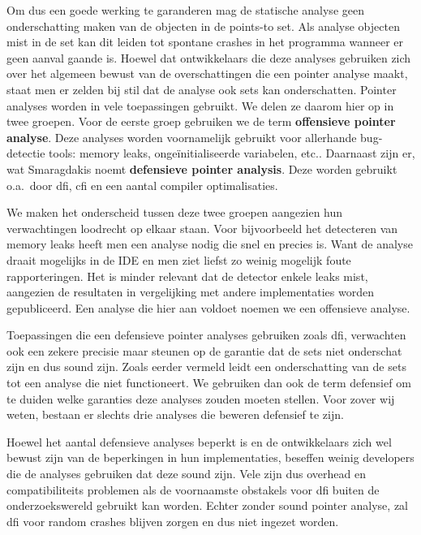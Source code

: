 \documentclass[conference]{IEEEtran}
\begin{document}
Om dus een goede werking te garanderen mag de statische analyse geen onderschatting maken van de objecten in de points-to set. Als analyse objecten mist in de set kan 
dit leiden tot spontane crashes in het programma wanneer er geen aanval gaande is. Hoewel dat ontwikkelaars die deze analyses gebruiken zich over het algemeen bewust 
van de overschattingen die een pointer analyse maakt, staat men er zelden bij stil dat de analyse ook sets kan onderschatten.
Pointer analyses worden in vele toepassingen gebruikt. We delen ze daarom hier op in twee groepen. Voor de eerste groep gebruiken we de term \textbf{offensieve pointer analyse}.
Deze analyses worden voornamelijk gebruikt voor allerhande bug-detectie tools: memory leaks, ongeïnitialiseerde variabelen, 
etc.\cite{sui_svf_nodate}\cite{cherem_practical_nodate}\cite{ye_accelerating_nodate}. Daarnaast zijn er, wat Smaragdakis\cite{smaragdakis_defensive_2018} noemt 
\textbf{defensieve pointer analysis}. Deze worden gebruikt o.a.\ door \gls{dfi}\cite{castro_securing_nodate}\cite{diez-franco_optimized_2024}, 
\gls{cfi}\cite{kasten_integrating_2024}\cite{li_finding_2020} en een aantal compiler optimalisaties\cite{hind_interprocedural_1999}. 

We maken het onderscheid tussen deze twee groepen aangezien hun verwachtingen loodrecht op elkaar staan. Voor bijvoorbeeld het detecteren van memory leaks heeft men 
een analyse nodig die snel en precies is\cite{cherem_practical_nodate}\cite{fan_smoke_2019}. Want de analyse draait mogelijks in de IDE en men ziet liefst zo weinig 
mogelijk foute rapporteringen. Het is minder relevant dat de detector enkele leaks mist, aangezien de resultaten in vergelijking met andere implementaties worden gepubliceerd.
Een analyse die hier aan voldoet noemen we een offensieve analyse.

Toepassingen die een defensieve pointer analyses gebruiken zoals \gls{dfi}, verwachten ook een zekere precisie maar steunen op de garantie dat de sets niet onderschat zijn en dus 
sound zijn. Zoals eerder vermeld leidt een onderschatting van de sets tot een analyse die niet functioneert. We gebruiken dan ook de term defensief om te duiden welke garanties deze 
analyses zouden moeten stellen. Voor zover wij weten, bestaan er slechts drie analyses die beweren defensief te zijn.\cite{smaragdakis_defensive_2018}\cite{cai_unleashing_nodate}\cite{lu_practical_2023}

Hoewel het aantal defensieve analyses beperkt is en de ontwikkelaars zich wel bewust zijn van de beperkingen in hun implementaties\cite{vojnar_phasar_2019}, beseffen weinig 
developers die de analyses gebruiken dat deze sound zijn. Vele zijn dus overhead en compatibiliteits problemen als de voornaamste obstakels\cite{mathiasen_fine-grained_2021}\cite{bellec_rt-dfi_2022}\cite{diez-franco_optimized_2024}\cite{feng_toward_2022} 
voor \gls{dfi} buiten de onderzoekswereld gebruikt kan worden. Echter zonder sound pointer analyse, zal \gls{dfi} voor random crashes blijven zorgen en dus niet ingezet worden.
\end{document}
